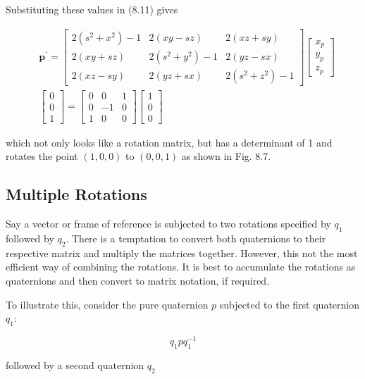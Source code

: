 \documentclass[10pt]{article}
\begin{document}
Substituting these values in (8.11) gives

$$
\begin{aligned}
& \mathbf{p}^{\prime}=\left[\begin{array}{ccc}
2\left(s^{2}+x^{2}\right)-1 & 2(x y-s z) & 2(x z+s y) \\
2(x y+s z) & 2\left(s^{2}+y^{2}\right)-1 & 2(y z-s x) \\
2(x z-s y) & 2(y z+s x) & 2\left(s^{2}+z^{2}\right)-1
\end{array}\right]\left[\begin{array}{l}
x_{p} \\
y_{p} \\
z_{p}
\end{array}\right] \\
& {\left[\begin{array}{l}
0 \\
0 \\
1
\end{array}\right]=\left[\begin{array}{ccc}
0 & 0 & 1 \\
0 & -1 & 0 \\
1 & 0 & 0
\end{array}\right]\left[\begin{array}{l}
1 \\
0 \\
0
\end{array}\right] }
\end{aligned}
$$

which not only looks like a rotation matrix, but has a determinant of 1 and rotates the point $(1,0,0)$ to $(0,0,1)$ as shown in Fig. 8.7.

\subsection{Multiple Rotations}
Say a vector or frame of reference is subjected to two rotations specified by $q_{1}$ followed by $q_{2}$. There is a temptation to convert both quaternions to their respective matrix and multiply the matrices together. However, this not the most efficient way of combining the rotations. It is best to accumulate the rotations as quaternions and then convert to matrix notation, if required.

To illustrate this, consider the pure quaternion $p$ subjected to the first quaternion $q_{1}:$

$$
q_{1} p q_{1}^{-1}
$$

followed by a second quaternion $q_{2}$
\end{document}
